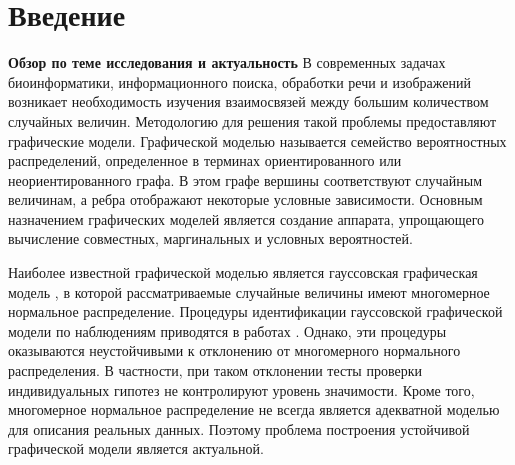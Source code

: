 \section*{Введение}

\textbf{Обзор по теме исследования и актуальность} \quad
В современных задачах биоинформатики, информационного поиска,
обработки речи и изображений возникает необходимость изучения
взаимосвязей между большим количеством случайных величин.
Методологию для решения такой проблемы предоставляют графические модели. 
Графической моделью \cite{Jordan2004} называется 
семейство вероятностных распределений, определенное в терминах
ориентированного или неориентированного графа. В этом графе вершины 
соответствуют случайным величинам, 
а ребра отображают некоторые условные зависимости. 
Основным назначением графических моделей является создание
аппарата, упрощающего вычисление
совместных, маргинальных и условных вероятностей.

Наиболее известной графической моделью является 
гауссовская графическая модель \cite{Anderson2003}, в которой рассматриваемые
случайные величины имеют многомерное нормальное распределение. Процедуры
идентификации гауссовской графической модели по наблюдениям
приводятся в работах \cite{Drton2004, Drton2007}. Однако, 
эти процедуры оказываются неустойчивыми к отклонению от многомерного
нормального распределения.
В частности, при таком отклонении тесты проверки индивидуальных гипотез 
не контролируют уровень значимости. 
Кроме того, многомерное нормальное распределение не всегда является
адекватной моделью для описания реальных данных. Поэтому проблема
построения устойчивой графической модели является актуальной. 

